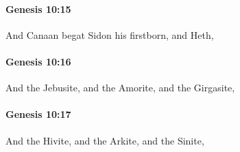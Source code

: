 		\paragraph{Genesis 10:15} %
			\label{GENESIS-10-15}

			And Canaan begat Sidon his firstborn, and Heth,


		\paragraph{Genesis 10:16} %
			\label{GENESIS-10-16}

			And the Jebusite, and the Amorite, and the Girgasite,


		\paragraph{Genesis 10:17} %
			\label{GENESIS-10-17}

			And the Hivite, and the Arkite, and the Sinite,


